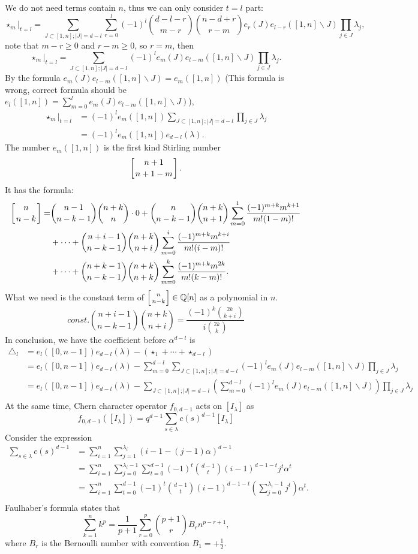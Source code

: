 \documentclass{article}
\newcommand{\bb}[1]{\mathbb{#1}}
\newcommand{\lr}[1]{\left({#1}\right)}
\begin{document}
We do not need terms contain $n$, thus we can only consider $t=l$ part:
\[
\star_m|_{t=l} = \sum_{J\subset[1,n];|J|=d-l}\sum_{r=0}^l(-1)^l\binom{d-l-r}{m-r}\binom{n-d+r}{r-m}e_r(J)e_{l-r}([1,n]\backslash J)\prod_{j\in J}\lambda_j,
\]
note that $m-r\geqslant 0$ and $r-m\geqslant 0$, so $r = m$, then
\[
\star_m|_{t=l} = \sum_{J\subset[1,n];|J|=d-l}(-1)^le_m(J)e_{l-m}([1,n]\backslash J)\prod_{j\in J}\lambda_j.
\]
By the formula $e_m(J)e_{l-m}([1,n]\backslash J) = e_m([1,n])$ \color{red}(This formula is wrong, correct formula should be $e_l([1,n]) = \sum_{m=0}^le_m(J)e_{l-m}([1,n]\backslash J)$),
\[
\begin{aligned}
\star_m|_{t=l} &= (-1)^le_m([1,n])\sum_{J\subset[1,n];|J|=d-l}\prod_{j\in J}\lambda_j\\
&= (-1)^le_m([1,n])e_{d-l}(\lambda).
\end{aligned}
\]
\color{black}The number $e_m([1,n])$ is the first kind Stirling number \[\left[ {n+1 \atop n+1-m} \right].\]
It has the formula:
\[
\begin{aligned}
\left[ {n \atop n-k} \right] = &\binom{n-1}{n-k-1}\binom{n+k}{n}\cdot 0 + \binom{n}{n-k-1}\binom{n+k}{n+1}\sum_{m=0}^1\frac{(-1)^{m+k}m^{k+1}}{m!(1-m)!}\\
&+ \cdots + \binom{n+i-1}{n-k-1}\binom{n+k}{n+i}\sum_{m=0}^i\frac{(-1)^{m+k}m^{k+i}}{m!(i-m)!}\\
&+ \cdots + \binom{n+k-1}{n-k-1}\binom{n+k}{n+k}\sum_{m=0}^k\frac{(-1)^{m+k}m^{2k}}{m!(k-m)!}.
\end{aligned}
\]
What we need is the constant term of $\left[ {n \atop n-k} \right]\in\bb{Q}[n]$ as a polynomial in $n$.
\[const.\binom{n+i-1}{n-k-1}\binom{n+k}{n+i} = \frac{(-1)^k\binom{2k}{k+i}}{i\binom{2k}{k}}\]
In conclusion, we have the coefficient before $\alpha^{d-l}$ is 
\[
\begin{aligned}
\triangle_l &= e_l([0,n-1])e_{d-l}(\lambda) - (\star_1+\cdots+\star_{d-l})\\
&= e_l([0,n-1])e_{d-l}(\lambda) - \sum_{m=0}^{d-l}\sum_{J\subset[1,n];|J|=d-l}(-1)^le_m(J)e_{l-m}([1,n]\backslash J)\prod_{j\in J}\lambda_j\\
&= e_l([0,n-1])e_{d-l}(\lambda) - \sum_{J\subset[1,n];|J|=d-l}\lr{\sum_{m=0}^{d-l}(-1)^le_m(J)e_{l-m}([1,n]\backslash J)}\prod_{j\in J}\lambda_j\\
\end{aligned}
\]
At the same time, Chern character operator $f_{0,d-1}$ acts on $[I_\lambda]$ as 
\[
f_{0,d-1}([I_\lambda]) = q^{d-1}\sum_{s\in\lambda}c(s)^{d-1}[I_\lambda]
\]
Consider the expression
\[
\begin{aligned}
\sum_{s\in\lambda}c(s)^{d-1} &= \sum_{i=1}^n\sum_{j=1}^{\lambda_i}(i-1-(j-1)\alpha)^{d-1}\\
&= \sum_{i=1}^{n}\sum_{j=0}^{\lambda_i-1}\sum_{t=0}^{d-1}(-1)^t\binom{d-1}{t}(i-1)^{d-1-t}j^t\alpha^t\\
&= \sum_{i=1}^{n}\sum_{t=0}^{d-1}(-1)^t\binom{d-1}{t}(i-1)^{d-1-t}\lr{\sum_{j=0}^{\lambda_i-1}j^t}\alpha^t.\\
\end{aligned}
\]
Faulhaber's formula states that 
\[\sum_{k=1}^n k^p = \frac{1}{p+1}\sum_{r=0}^p\binom{p+1}{r}B_rn^{p-r+1},\]
where $B_r$ is the Bernoulli number with convention $B_1=+\frac12.$
\end{document}
